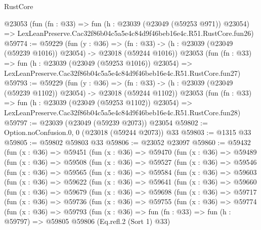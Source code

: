 \begin{lexlean}{RustCore}
\begin{coremodule}
    @23053
    (fun (fn : @33) =>
    fun (h : @23039 (@23049 (@59253 @971)) @23054) =>
    LexLeanPreserve.Cac32f86b04c5a5e4c84d9f46beb16e4c.R51.RustCore.fun26)
@59774 := @59229
    (fun (y : @36) =>
    (fn : @33) -> (h : @23039 (@23049 (@59239 @1016)) @23054) -> @23018 (@59244 @1016))
    @23053
    (fun (fn : @33) =>
    fun (h : @23039 (@23049 (@59253 @1016)) @23054) =>
    LexLeanPreserve.Cac32f86b04c5a5e4c84d9f46beb16e4c.R51.RustCore.fun27)
@59793 := @59229
    (fun (y : @36) =>
    (fn : @33) -> (h : @23039 (@23049 (@59239 @1102)) @23054) -> @23018 (@59244 @1102))
    @23053
    (fun (fn : @33) =>
    fun (h : @23039 (@23049 (@59253 @1102)) @23054) =>
    LexLeanPreserve.Cac32f86b04c5a5e4c84d9f46beb16e4c.R51.RustCore.fun28)
@59797 := @23039 (@23049 (@59239 @2073)) @23054
@59802 := Option.noConfusion.{0, 0} (@23018 (@59244 @2073)) @33
@59803 := @1315 @33
@59805 := @59802 @59803 @33
@59806 := @23052 @23097
@59860 := @59432
    (fun (x : @36) =>
    @59451
      (fun (x : @36) =>
      @59470
        (fun (x : @36) =>
        @59489
          (fun (x : @36) =>
          @59508
            (fun (x : @36) =>
            @59527
              (fun (x : @36) =>
              @59546
                (fun (x : @36) =>
                @59565
                  (fun (x : @36) =>
                  @59584
                    (fun (x : @36) =>
                    @59603
                      (fun (x : @36) =>
                      @59622
                        (fun (x : @36) =>
                        @59641
                          (fun (x : @36) =>
                          @59660
                            (fun (x : @36) =>
                            @59679
                              (fun (x : @36) =>
                              @59698
                                (fun (x : @36) =>
                                @59717
                                  (fun (x : @36) =>
                                  @59736
                                    (fun (x : @36) =>
                                    @59755
                                      (fun (x : @36) =>
                                      @59774
                                        (fun (x : @36) =>
                                        @59793
                                          (fun (x : @36) =>
                                          fun (fn : @33) =>
                                          fun (h : @59797) =>
                                          @59805
                                            @59806
                                            (Eq.refl.{2} (Sort 1) @33)

\end{coremodule}
\end{lexlean}
